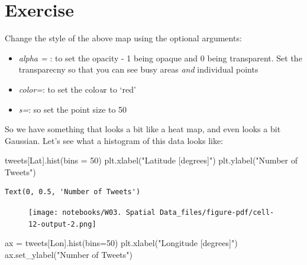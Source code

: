 \documentclass[
  letterpaper,
  DIV=11,
  numbers=noendperiod]{scrreprt}
\newenvironment{Shaded}{\begin{snugshade}}{\end{snugshade}}
\newcommand{\DecValTok}[1]{\textcolor[rgb]{0.68,0.00,0.00}{#1}}
\newcommand{\NormalTok}[1]{\textcolor[rgb]{0.00,0.23,0.31}{#1}}
\newcommand{\OperatorTok}[1]{\textcolor[rgb]{0.37,0.37,0.37}{#1}}
\newcommand{\StringTok}[1]{\textcolor[rgb]{0.13,0.47,0.30}{#1}}
\providecommand{\tightlist}{%
  \setlength{\itemsep}{0pt}\setlength{\parskip}{0pt}}\usepackage{longtable,booktabs,array}
\begin{document}
\hypertarget{exercise-6}{%
\section{Exercise}\label{exercise-6}}

Change the style of the above map using the optional arguments:

\begin{itemize}
\tightlist
\item
  \emph{alpha = }: to set the opacity - 1 being opaque and 0 being
  transparent. Set the transparecny so that you can see busy areas
  \emph{and} individual points
\item
  \emph{color=}: to set the colo\emph{u}r to `red'
\item
  \emph{s=}: so set the point size to 50
\end{itemize}

So we have something that looks a bit like a heat map, and even looks a
bit Gaussian. Let's see what a histogram of this data looks like:

\begin{Shaded}
\begin{Highlighting}[]
\NormalTok{tweets[}\StringTok{\textquotesingle{}Lat\textquotesingle{}}\NormalTok{].hist(bins }\OperatorTok{=} \DecValTok{50}\NormalTok{)}
\NormalTok{plt.xlabel(}\StringTok{"Latitude [degrees]"}\NormalTok{)}
\NormalTok{plt.ylabel(}\StringTok{"Number of Tweets"}\NormalTok{)}
\end{Highlighting}
\end{Shaded}

\begin{verbatim}
Text(0, 0.5, 'Number of Tweets')
\end{verbatim}

\begin{figure}[H]

{\centering \texttt{[image: notebooks/W03. Spatial Data\_files/figure-pdf/cell-12-output-2.png]}

}

\end{figure}

\begin{Shaded}
\begin{Highlighting}[]
\NormalTok{ax }\OperatorTok{=}\NormalTok{ tweets[}\StringTok{\textquotesingle{}Lon\textquotesingle{}}\NormalTok{].hist(bins}\OperatorTok{=}\DecValTok{50}\NormalTok{)}
\NormalTok{plt.xlabel(}\StringTok{"Longitude [degrees]"}\NormalTok{)}
\NormalTok{ax.set\_ylabel(}\StringTok{"Number of Tweets"}\NormalTok{)}
\end{Highlighting}
\end{Shaded}
\end{document}
